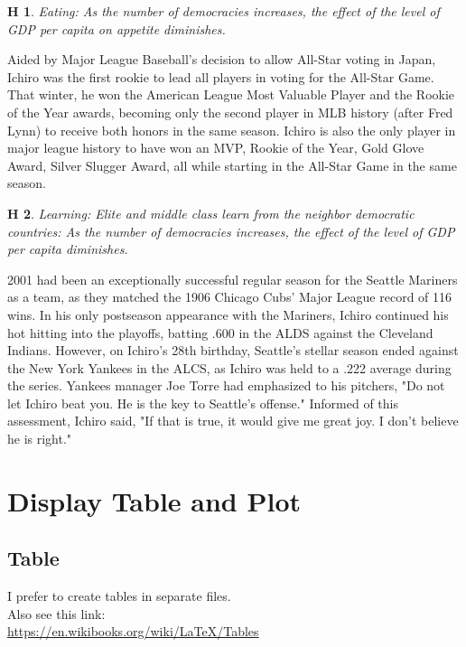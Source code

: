 \documentclass[12pt]{article}
\theoremstyle{hypotheses}
\newtheorem{hyp}{H}
\begin{document}
\bigskip
\begin{hyp}
Eating: As the number of democracies increases, the effect of the level of GDP per capita on appetite diminishes.  
\end{hyp}

Aided by Major League Baseball's decision to allow All-Star voting in Japan, Ichiro was the first rookie to lead all players in voting for the All-Star Game. That winter, he won the American League Most Valuable Player and the Rookie of the Year awards, becoming only the second player in MLB history (after Fred Lynn) to receive both honors in the same season. Ichiro is also the only player in major league history to have won an MVP, Rookie of the Year, Gold Glove Award, Silver Slugger Award, all while starting in the All-Star Game in the same season.

\bigskip
\begin{hyp}
Learning: Elite and middle class learn from the neighbor democratic countries: As the number of democracies increases, the effect of the level of GDP per capita diminishes.  
\end{hyp}

2001 had been an exceptionally successful regular season for the Seattle Mariners as a team, as they matched the 1906 Chicago Cubs' Major League record of 116 wins. In his only postseason appearance with the Mariners, Ichiro continued his hot hitting into the playoffs, batting .600 in the ALDS against the Cleveland Indians. However, on Ichiro's 28th birthday, Seattle's stellar season ended against the New York Yankees in the ALCS, as Ichiro was held to a .222 average during the series. Yankees manager Joe Torre had emphasized to his pitchers, "Do not let Ichiro beat you. He is the key to Seattle's offense." Informed of this assessment, Ichiro said, "If that is true, it would give me great joy. I don't believe he is right."

\section*{Display Table and Plot}
\subsection*{Table}
I prefer to create tables in separate files.  \\
Also see this link:\\
\url{https://en.wikibooks.org/wiki/LaTeX/Tables} \\
\end{document}
